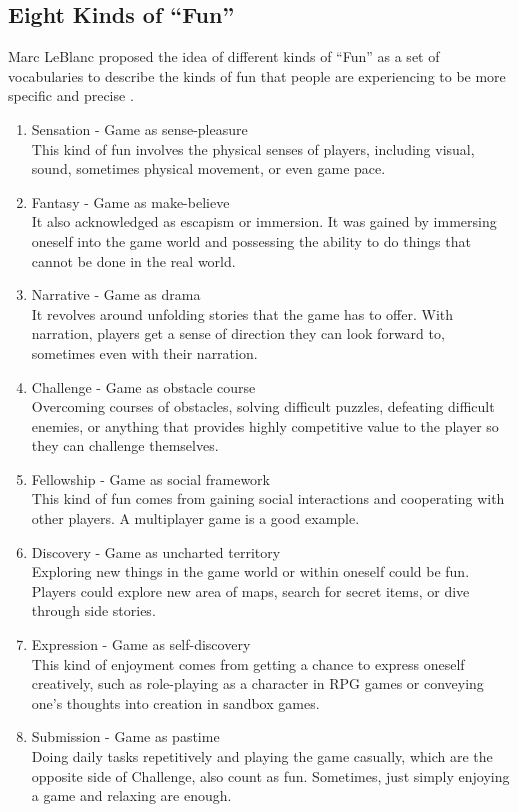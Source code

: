 \documentclass[12pt,oneside,openright,a4paper]{cpe-english-project}
\begin{document}
\subsection{Eight Kinds of “Fun”}
Marc LeBlanc proposed the idea of different kinds of “Fun” as a set of vocabularies to describe the kinds of fun that people are experiencing to be more specific and precise \cite{chris2016gnomestew}.

\begin{enumerate}
	\item Sensation - Game as sense-pleasure \\
	This kind of fun involves the physical senses of players, including visual, sound, sometimes physical movement, or even game pace.
	\item Fantasy - Game as make-believe \\
	It also acknowledged as escapism or immersion. It was gained by immersing oneself into the game world and possessing the ability to do things that cannot be done in the real world.
	\item Narrative - Game as drama \\
	It revolves around unfolding stories that the game has to offer. With narration, players get a sense of direction they can look forward to, sometimes even with their narration.
	\item Challenge - Game as obstacle course \\
	Overcoming courses of obstacles, solving difficult puzzles, defeating difficult enemies, or anything that provides highly competitive value to the player so they can challenge themselves.
	\item Fellowship - Game as social framework \\
	This kind of fun comes from gaining social interactions and cooperating with other players. A multiplayer game is a good example.
	\item Discovery - Game as uncharted territory \\
	Exploring new things in the game world or within oneself could be fun. Players could explore new area of maps, search for secret items, or dive through side stories.
	\item Expression - Game as self-discovery \\
	This kind of enjoyment comes from getting a chance to express oneself creatively, such as role-playing as a character in RPG games or conveying one's thoughts into creation in sandbox games.
	\item Submission - Game as pastime \\
	Doing daily tasks repetitively and playing the game casually, which are the opposite side of Challenge, also count as fun. Sometimes, just simply enjoying a game and relaxing are enough.
\end{enumerate}
\end{document}

